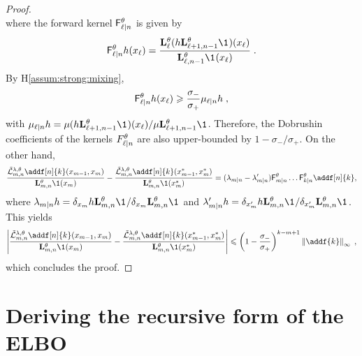 \documentclass{article}
\begin{document}
\begin{proof}
$$$$
where the forward kernel $ \mathsf{F}^\theta_{\ell|n}$ is given by
$$
 \mathsf{F}^\parvec_{\ell|n}h(x_\ell) = \frac{\uk{\ell}{\parvec}(h\uk{\ell+1, n-1}{\parvec}\1_{})(x_\ell)}{ \uk{\ell, n-1}{\parvec}\1_{}(x_\ell)}\eqsp.
$$
By H\ref{assum:strong:mixing},
$$
 \mathsf{F}^\theta_{\ell|n}h(x_\ell) \geqslant \frac{\sigma_-}{\sigma_+}\mu_{\ell|n}h\;,
$$
with $\mu_{\ell|n}h = \mu(h\uk{\ell+1, n-1}{\parvec}\1_{})(x_\ell) / \mu\uk{\ell+1, n-1}{\parvec}\1_{}$. Therefore, the Dobrushin coefficients of the kernels $F^\theta_{\ell|n}$  are also upper-bounded by $1-\sigma_-/\sigma_+$. On the other hand,
$$
\frac{\tilde{\mathcal{L}}^{\parvar,\parvec}_{m, n}\addf[n]{k}(x_{m-1},x_m) }{\uk{m, n}{\parvec}\1(x_m)} - \frac{\tilde{\mathcal{L}}^{\parvar,\parvec}_{m, n}\addf[n]{k}(x^*_{m-1},x^*_m) }{\uk{m, n}{\parvec}\1(x^*_m)} = (\lambda_{m|n} - \lambda'_{m|n})\mathsf{F}^\parvec_{m|n}\ldots \mathsf{F}^\parvec_{k|n}\addf[n]{k}, 
$$
where $\lambda_{m|n}h = \delta_{x_m}h\uk{m, n}{\parvec}\1_{}/\delta_{x_m}\uk{m, n}{\parvec}\1_{}$ and $\lambda'_{m|n}h = \delta_{x'_m}h\uk{m, n}{\parvec}\1_{}/\delta_{x'_m}\uk{m, n}{\parvec}\1_{}$.
This yields
$$
\left|\frac{\tilde{\mathcal{L}}^{\parvar,\parvec}_{m, n}\addf[n]{k}(x_{m-1},x_m) }{\uk{m, n}{\parvec}\1(x_m)} - \frac{\tilde{\mathcal{L}}^{\parvar,\parvec}_{m, n}\addf[n]{k}(x^*_{m-1},x^*_m) }{\uk{m, n}{\parvec}\1(x^*_m)}\right|\leqslant  \left(1-\frac{\sigma_-}{\sigma_+}\right)^{k-m+1}\left\|\addf{k}\right\|_\infty\eqsp,
$$
which concludes the proof.
 
\end{proof}

\section{Deriving the recursive form of the ELBO}
\end{document}
